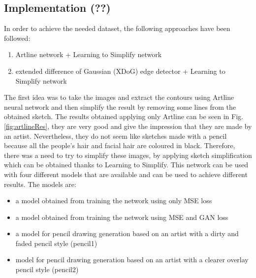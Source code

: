 \subsection{Implementation (??)}
In order to achieve the needed dataset, the following approaches have been followed:
\begin{enumerate}
    \item Artline network + Learning to Simplify network
    \item extended difference of Gaussian (XDoG) edge detector + Learning to Simplify network
\end{enumerate}
The first idea was to take the images and extract the contours using Artline neural network and then simplify the result by removing some lines from the obtained sketch.
The results obtained applying only Artline can be seen in Fig. \ref{fig:artlineRes}, they are very good and give the impression that they are made by an artist. Nevertheless, they do not seem like sketches made with a pencil because all the people's hair and facial hair are coloured in black. Therefore, there was a need to try to simplify these images, by applying sketch simplification which can be obtained thanks to Learning to Simplify. This network can be used with four different models that are available and can be used to achieve different results.
\noindent The models are:
\begin{itemize}
    \item a model obtained from training the network using only MSE loss
    \item a model obtained from training the network using MSE and GAN loss
    \item a model for pencil drawing generation based on an artist with a dirty and faded pencil style (pencil1)
    \item model for pencil drawing generation based on an artist with a clearer overlay pencil style (pencil2)
\end{itemize}
